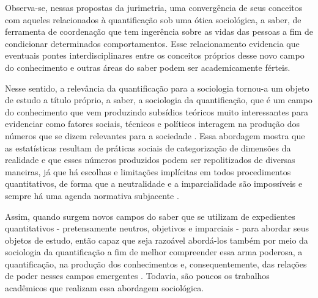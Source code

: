 Observa-se, nessas propostas da jurimetria, uma convergência de seus conceitos com aqueles relacionados à quantificação sob uma ótica sociológica, a saber, de ferramenta de coordenação que tem ingerência sobre as vidas das pessoas a fim de condicionar determinados comportamentos. Esse relacionamento evidencia que eventuais pontes interdisciplinares entre os conceitos próprios desse novo campo do conhecimento e outras áreas do saber podem ser academicamente férteis.

Nesse sentido, a relevância da quantificação para a sociologia tornou-a um objeto de estudo a título próprio, a saber, a sociologia da quantificação, que é um campo do conhecimento que vem produzindo subsídios teóricos muito interessantes para evidenciar como fatores sociais, técnicos e políticos interagem na produção dos números que se dizem relevantes para a sociedade \cite{berman2018sociology}. Essa abordagem mostra que as estatísticas resultam de práticas sociais de categorização de dimensões da realidade e que esses números produzidos podem ser repolitizados de diversas maneiras, já que há escolhas e limitações implícitas em todos procedimentos quantitativos, de forma que a neutralidade e a imparcialidade são impossíveis e sempre há uma agenda normativa subjacente \cite{camargo2021quantificaccao}.

Assim, quando surgem novos campos do saber que se utilizam de expedientes quantitativos - pretensamente neutros, objetivos e imparciais - para abordar seus objetos de estudo, então capaz que seja razoável abordá-los também por meio da sociologia da quantificação a fim de melhor compreender essa arma poderosa, a quantificação, na produção dos conhecimentos e, consequentemente, das relações de poder nesses campos emergentes \cite{didier2013pour}. Todavia, são poucos os trabalhos acadêmicos que realizam essa abordagem sociológica.

